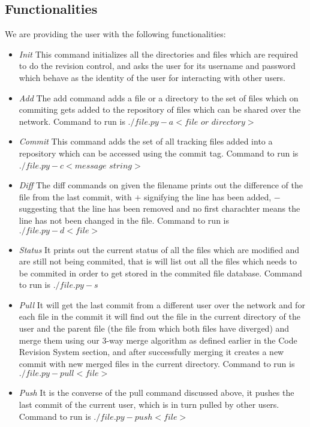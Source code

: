 \documentclass[12pt]{article}
\begin{document}
\subsection{Functionalities}
We are providing the user with the following functionalities:
\begin{itemize}
\item \emph{Init} This command initializes all the directories and files which are required to do the revision control, and asks the user for its username and password which behave as the identity of the user for interacting with other users.
\item \emph{Add} The add command adds a file or a directory to the set of files which on commiting gets added to the repository of files which can be shared over the network. Command to run is $./file.py -a <file$ $or$ $directory>$
\item \emph{Commit} This command adds the set of all tracking files added into a repository which can be accessed using the commit tag. Command to run is $./file.py -c <message$ $string>$
\item \emph{Diff} The diff commands on given the filename prints out the difference of the file from the last commit, with $+$ signifying the line has been added, $-$ suggesting that the line has been removed and no first charachter means the line has not been changed in the file. Command to run is $./file.py -d <file>$
\item \emph{Status} It prints out the current status of all the files which are modified and are still not being commited, that is will list out all the files which needs to be commited in order to get stored in the commited file database. Command to run is $./file.py -s$
\item \emph{Pull} It will get the last commit from a different user over the network and for each file in the commit it will find out the file in the current directory of the user and the parent file (the file from which both files have diverged) and merge them using our 3-way merge algorithm as defined earlier in the Code Revision System section, and after successfully merging it creates a new commit with new merged files in the current directory. Command to run is $./file.py -pull <file>$
\item \emph{Push} It is the converse of the pull command discussed above, it pushes the last commit of the current user, which is in turn pulled by other users. Command to run is $./file.py -push <file>$

\end{itemize}
\end{document}
